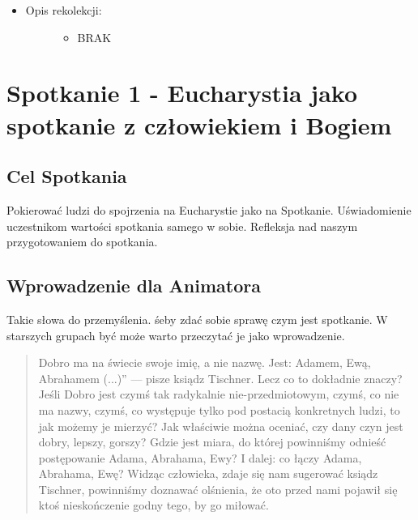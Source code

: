 \documentclass[a5paper,10pt,polish]{book}
\begin{document}
\begin{itemize}
\begin{description}
\end{description}

\item {} \begin{description}
\item[{Opis rekolekcji:}] \leavevmode\begin{itemize}
\item {} 
BRAK

\end{itemize}

\end{description}

\end{itemize}


\chapter{Spotkanie 1 - Eucharystia jako spotkanie z człowiekiem i Bogiem}
\label{babice2006-jesien-knurow/spotkanie1::doc}\label{babice2006-jesien-knurow/spotkanie1:spotkanie-1-eucharystia-jako-spotkanie-z-czlowiekiem-i-bogiem}

\section{Cel Spotkania}
\label{babice2006-jesien-knurow/spotkanie1:cel-spotkania}
Pokierować ludzi do spojrzenia na Eucharystie jako na Spotkanie. Uświadomienie uczestnikom wartości spotkania samego w sobie. Refleksja nad naszym przygotowaniem do spotkania.


\section{Wprowadzenie dla Animatora}
\label{babice2006-jesien-knurow/spotkanie1:wprowadzenie-dla-animatora}
Takie słowa do przemyślenia. śeby zdać sobie sprawę czym jest spotkanie. W starszych grupach być może warto przeczytać je jako wprowadzenie.
\begin{quote}

Dobro ma na świecie swoje imię, a nie nazwę. Jest: Adamem, Ewą, Abrahamem (...)” — pisze ksiądz Tischner. Lecz co to dokładnie znaczy? Jeśli Dobro jest czymś tak radykalnie nie-przedmiotowym, czymś, co nie ma nazwy, czymś, co występuje tylko pod postacią konkretnych ludzi, to jak możemy je mierzyć? Jak właściwie można oceniać, czy dany czyn jest dobry, lepszy, gorszy? Gdzie jest miara, do której powinniśmy odnieść postępowanie Adama, Abrahama, Ewy? I dalej: co łączy Adama, Abrahama, Ewę? Widząc człowieka, zdaje się nam sugerować ksiądz Tischner, powinniśmy doznawać olśnienia, że oto przed nami pojawił się ktoś nieskończenie godny tego, by go miłować.
\end{quote}
\end{document}
